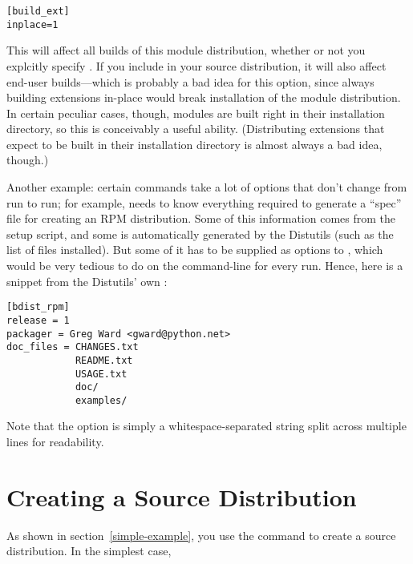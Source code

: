 \documentclass{howto}
\begin{document}
\begin{verbatim}
[build_ext]
inplace=1
\end{verbatim}

This will affect all builds of this module distribution, whether or not
you explcitly specify .  If you include
 in your source distribution, it will also affect
end-user builds---which is probably a bad idea for this option, since
always building extensions in-place would break installation of the
module distribution.  In certain peculiar cases, though, modules are
built right in their installation directory, so this is conceivably a
useful ability.  (Distributing extensions that expect to be built in
their installation directory is almost always a bad idea, though.)

Another example: certain commands take a lot of options that don't
change from run to run; for example,  needs to know
everything required to generate a ``spec'' file for creating an RPM
distribution.  Some of this information comes from the setup script, and
some is automatically generated by the Distutils (such as the list of
files installed).  But some of it has to be supplied as options to
, which would be very tedious to do on the
command-line for every run.  Hence, here is a snippet from the
Distutils' own :

\begin{verbatim}
[bdist_rpm]
release = 1
packager = Greg Ward <gward@python.net>
doc_files = CHANGES.txt
            README.txt
            USAGE.txt
            doc/
            examples/
\end{verbatim}

Note that the  option is simply a
whitespace-separated string split across multiple lines for readability.


\begin{seealso}
\end{seealso}


\section{Creating a Source Distribution}
\label{source-dist}

As shown in section~\ref{simple-example}, you use the
 command to create a source distribution.  In the
simplest case,
\end{document}
